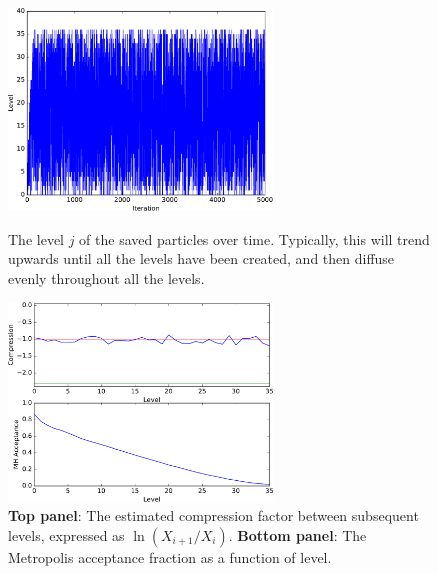 \documentclass[article]{jss}
\begin{document}
\begin{figure}[ht!]
\begin{minipage}{7.5cm}
\centering
\includegraphics[width=7cm]{figures/fig1.pdf}
\caption{The level $j$ of the saved particles over time.
Typically, this will trend upwards until all the levels have
been created, and then diffuse evenly throughout all the levels.
\label{fig:fig1}}
\end{minipage}\hspace{0.5cm}
\begin{minipage}{7.5cm}
\centering
\includegraphics[width=7cm]{figures/fig2.pdf}
\caption{{\bf Top panel}: The estimated compression factor between subsequent
levels, expressed as $\ln(X_{i+1}/X_{i})$. {\bf Bottom panel}:
The Metropolis acceptance fraction as a function of level.
\label{fig:fig2}}
\end{minipage}
\end{figure}
\end{document}

